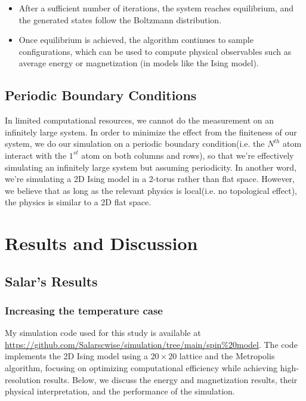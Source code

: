 \documentclass[11pt]{article}
\begin{document}
\begin{itemize}
    \item After a sufficient number of iterations, the system reaches equilibrium, and the generated states follow the Boltzmann distribution.
    \item Once equilibrium is achieved, the algorithm continues to sample configurations, which can be used to compute physical observables such as average energy or magnetization (in models like the Ising model).
\end{itemize}

\subsection{Periodic Boundary Conditions}

In limited computational resources, we cannot do the measurement on an infinitely large system. In order to minimize the effect from the finiteness of our system, we do our simulation on a periodic boundary condition(i.e. the $N^{th}$ atom interact with the $1^{st}$ atom on both columns and rows), so that we're effectively simulating an infinitely large system but assuming periodicity. In another word, we're simulating a 2D Ising model in a 2-torus rather than flat space. However, we believe that as long as the relevant physics is local(i.e. no topological effect), the physics is similar to a 2D flat space.

\section{Results and Discussion}\label{results}

\subsection{Salar's Results}

\subsubsection*{Increasing the temperature case}
\noindent My simulation code used for this study is available at \url{https://github.com/Salarscwise/simulation/tree/main/spin%20model}. The code implements the 2D Ising model using a \(20 \times 20\) lattice and the Metropolis algorithm, focusing on optimizing computational efficiency while achieving high-resolution results. Below, we discuss the energy and magnetization results, their physical interpretation, and the performance of the simulation.
\end{document}
